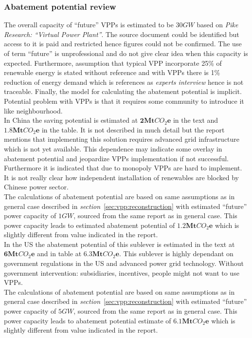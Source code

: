 \documentclass[11pt, twocolumn]{article}
\begin{document}
\subsubsection{Abatement potential review}
The overall capacity of ``future'' VPPs is estimated to be $30GW$ based on \emph{Pike Research: ``Virtual Power Plant''}. The source document could be identified but access to it is paid and restricted hence figures could not be confirmed. The use of term ``future'' is unprofessional and do not give clear idea when this capacity is expected. Furthermore, assumption that typical VPP incorporate 25\% of renewable energy is stated without reference and with VPPs there is 1\% reduction of energy demand which is references as \emph{experts interview} hence is not traceable. Finally, the model for calculating the abatement potential is implicit.\\
Potential problem with VPPs is that it requires some community to introduce it like neighbourhood.\\

In China the saving potential is estimated at $\mathbf{2} \mathbf{Mt}CO_2\mathbf{e}$ in the text and $\mathbf{1.8} \mathbf{Mt}CO_2\mathbf{e}$ in the table. It is not described in much detail but the report mentions that implementing this solution requires advanced grid infrastructure which is not yet available. This dependence may indicate some overlay in abatement potential and jeopardize VPPs implementation if not successful. Furthermore it is indicated that due to monopoly VPPs are hard to implement. It is not really clear how independent installation of renewables are blocked by Chinese power sector.\\
The calculations of abatement potential are based on same assumptions as in general case described in \emph{section}~\ref{sec:vpp:reconstruction} with estimated ``future'' power capacity of $1GW$, sourced from the same report as in general case. This power capacity leads to estimated abatement potential of $\mathbf{1.2} \mathbf{Mt}CO_2\mathbf{e}$ which is slightly different from value indicated in the report.\\

In the US the abatement potential of this sublever is estimated in the text at $\mathbf{6} \mathbf{Mt}CO_2\mathbf{e}$ and in table at $\mathbf{6.3} \mathbf{Mt}CO_2\mathbf{e}$. This sublever is highly dependant on government regulations in the US and advanced power grid technology. Without government intervention: subsidiaries, incentives, people might not want to use VPPs.\\
The calculations of abatement potential are based on same assumptions as in general case described in \emph{section}~\ref{sec:vpp:reconstruction} with estimated ``future'' power capacity of $5GW$, sourced from the same report as in general case. This power capacity leads to abatement potential estimate of $\mathbf{6.1} \mathbf{Mt}CO_2\mathbf{e}$ which is slightly different from value indicated in the report.\\
\end{document}
